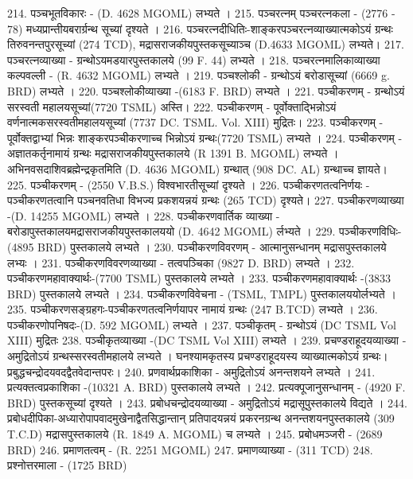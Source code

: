 214. पञ्चभूतविकारः - (D. 4628 MGOML) लभ्यते । 
215. पञ्चरत्नम् पञ्चरत्नकला - (2776 - 78) मध्यप्रान्तीयबरार्ग्रन्थ सूच्यां दृश्यते । 
216. पञ्चरत्नदीधितिः-शाङ्करपञ्चरत्नव्याख्यात्मकोऽयं ग्रन्थः तिरुवनन्तपुरसूच्यां (274 TCD), मद्रासराजकीयपुस्तकसूच्याञ्च (D.4633 MGOML) लभ्यते। 
217. पञ्चरत्नव्याख्या - ग्रन्थोऽयमडयारपुस्तकालये (99 F. 44) लभ्यते । 
218. पञ्चरत्नमालिकाव्याख्या कल्पवल्ली - (R. 4632 MGOML) लभ्यते । 
219. पञ्चश्लोकी - ग्रन्थोऽयं बरोडासूच्यां (6669 g. BRD) लभ्यते ।
220. पञ्चश्लोकीव्याख्या -(6183 F. BRD) लभ्यते ।
221. पञ्चीकरणम् - ग्रन्थोऽयं सरस्वती महालयसूच्यां(7720 TSML) अस्ति।
222. पञ्चीकरणम् - पूर्वोक्ताद्भिन्नोऽयं वर्णनात्मकसरस्वतीमहालयसूच्यां (7737 DC. TSML. Vol. XIII) मुद्रितः।
223. पञ्चीकरणम् - पूर्वोक्तद्वाभ्यां भिन्नः शाङ्करपञ्चीकरणाच्च भिन्नोऽयं ग्रन्थः(7720 TSML) लभ्यते । 
224. पञ्चीकरणम् - अज्ञातकर्तृनामायं ग्रन्थः मद्रासराजकीयपुस्तकालये (R 1391 B. MGOML) लभ्यते । अभिनवसदाशिवब्रह्मेन्द्रकृतमिति (D. 4636 MGOML) ग्रन्थात् (908 DC. AL) ग्रन्थाच्च ज्ञायते।  
225. पञ्चीकरणम् - (2550 V.B.S.) विश्वभारतीसूच्यां दृश्यते ।
226. पञ्चीकरणतत्वनिर्णयः - पञ्चीकरणतत्वानि पञ्चनवतिधा विभज्य प्रकशयन्नयं ग्रन्थः (265 TCD) दृश्यते। 
227. पञ्चीकरणव्याख्या -(D. 14255 MGOML) लभ्यते ।
228. पञ्चीकरणवार्तिक व्याख्या - बरोडापुस्तकालयमद्रासराजकीयपुस्तकालययो (D. 4642 MGOML) र्लभ्यते । 
229. पञ्चीकरणविधिः-(4895 BRD) पुस्तकालये लभ्यते । 
230. पञ्चीकरणविवरणम् - आत्मानुसन्धानम् मद्रासपुस्तकालये लभ्यः । 
231. पञ्चीकरणविवरणव्याख्या - तत्वपञ्चिका (9827 D. BRD) लभ्यते । 
232. पञ्चीकरणमहावाक्यार्थः-(7700 TSML) पुस्तकालये लभ्यते ।
233. पञ्चीकरणमहावाक्यार्थः -(3833 BRD) पुस्तकालये लभ्यते ।
234. पञ्चीकरणविवेचना - (TSML, TMPL) पुस्तकालययोर्लभ्यते । 
235. पञ्चीकरणसङ्ग्रहगः-पञ्चीकरणतत्वनिर्णयापर नामायं ग्रन्थः (247 B.TCD) लभ्यते । 
236. पञ्चीकरणोपनिषदः-(D. 592 MGOML) लभ्यते । 
237. पञ्चीकृतम् - ग्रन्थोऽयं (DC TSML Vol XIII) मुद्रितः 
238. पञ्चीकृतव्याख्या -(DC TSML Vol XIII) लभ्यते ।
239. प्रचण्डराहूदयव्याख्या - अमुद्रितोऽयं ग्रन्थस्सरस्वतीमहालये लभ्यते । घनश्यामकृतस्य प्रचण्डराहूदयस्य व्याख्यात्मकोऽयं ग्रन्थः। प्रबुद्धचन्द्रोदयवदद्वैतवेदान्तपरः।
240. प्रणवार्थप्रकाशिका - अमुद्रितोऽयं अनन्तशयने लभ्यते । 
241. प्रत्यक्तत्वप्रकाशिका -(10321 A. BRD) पुस्तकालये लभ्यते ।
242. प्रत्यक्पूजानुसन्धानम् - (4920 F. BRD) पुस्तकसूच्यां दृश्यते । 
243. प्रबोधचन्द्रोदयव्याख्या - अमुद्रितोऽयं मद्रासूपुस्तकालये विद्यते । 
244. प्रबोधदीपिका-अध्यारोपापवादमुखेनाद्वैतसिद्धान्तान् प्रतिपादयन्नयं प्रकरनग्रन्थ अनन्तशयनपुस्तकालये	(309 T.C.D) मद्रासपुस्तकालये (R. 1849 A. MGOML) च लभ्यते । 
245. प्रबोधमञ्जरी - (2689 BRD)
246. प्रमाणतत्वम् - (R. 2251 MGOML)
247. प्रमाणव्याख्या - (311 TCD)
248. प्रश्नोत्तरमाला - (1725 BRD)

